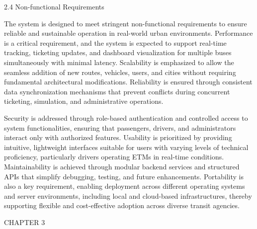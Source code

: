 2.4	 Non-functional Requirements

The system is designed to meet stringent non-functional requirements to ensure reliable and sustainable operation in real-world urban environments. Performance is a critical requirement, and the system is expected to support real-time tracking, ticketing updates, and dashboard visualization for multiple buses simultaneously with minimal latency. Scalability is emphasized to allow the seamless addition of new routes, vehicles, users, and cities without requiring fundamental architectural modifications. Reliability is ensured through consistent data synchronization mechanisms that prevent conflicts during concurrent ticketing, simulation, and administrative operations.

Security is addressed through role-based authentication and controlled access to system functionalities, ensuring that passengers, drivers, and administrators interact only with authorized features. Usability is prioritized by providing intuitive, lightweight interfaces suitable for users with varying levels of technical proficiency, particularly drivers operating ETMs in real-time conditions. Maintainability is achieved through modular backend services and structured APIs that simplify debugging, testing, and future enhancements. Portability is also a key requirement, enabling deployment across different operating systems and server environments, including local and cloud-based infrastructures, thereby supporting flexible and cost-effective adoption across diverse transit agencies.














CHAPTER 3

